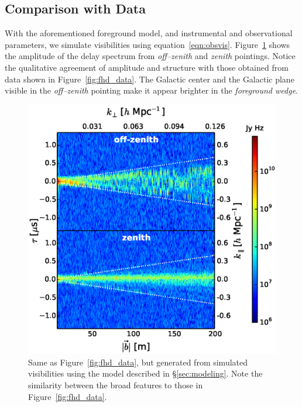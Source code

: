 \documentclass[preprint2,iop,numberedappendix]{emulateapj}
\begin{document}
\subsection{Comparison with Data}\label{sec:data-vs-model}

With the aforementioned foreground model, and instrumental and observational parameters, we simulate visibilities using equation~\ref{eqn:obsvis}. Figure~\ref{fig:sim_data} shows the amplitude of the delay spectrum from {\it off--zenith} and {\it zenith} pointings. Notice the qualitative agreement of amplitude and structure with those obtained from data shown in Figure~\ref{fig:fhd_data}. The Galactic center and the Galactic plane visible in the {\it off--zenith} pointing make it appear brighter in the {\it foreground wedge}. 

\begin{figure}[htb]
\centering
\includegraphics[width=\linewidth]{f7.eps}
\caption{Same as Figure~\ref{fig:fhd_data}, but generated from simulated visibilities using the model described in \S\ref{sec:modeling}. Note the similarity between the broad features to those in Figure~\ref{fig:fhd_data}. \label{fig:sim_data}}
\end{figure}
\end{document}

